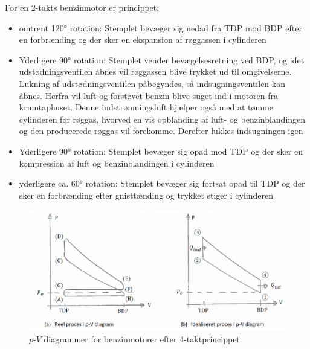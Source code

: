 For en 2-takts benzinmotor er princippet:
\begin{itemize}
  \item omtrent \ang{120} rotation: Stemplet bevæger sig nedad fra TDP mod BDP efter en forbrænding og der sker en ekspansion af røggassen i cylinderen
  \item Yderligere \ang{90} rotation: Stemplet vender bevægelsesretning ved BDP, og idet udstødningsventilen åbnes vil røggassen blive trykket ud til omgivelserne. Lukning af udstødningsventilen påbegyndes, så indsugningsventilen kan åbnes. Herfra vil luft og forstøvet benzin blive suget ind i motoren fra krumtaphuset. Denne indstrømningsluft hjælper også med at tømme cylinderen for røggas, hvorved en vis opblanding af luft- og benzinblandingen og den producerede røggas vil forekomme. Derefter lukkes indsugningen igen
  \item Yderligere \ang{90} rotation: Stemplet bevæger sig opad mod TDP og der sker en kompression af luft og benzinblandingen i cylinderen
  \item yderligere ca. \ang{60} rotation: Stemplet bevæger sig fortsat opad til TDP og der sker en forbrænding efter gnisttænding og trykket stiger i cylinderen
\end{itemize}

\begin{figure} [ht]
  \centering
  \includegraphics[width=0.5\linewidth]{./figures/f10_2.png}
  \caption{$p$-$V$ diagrammer for benzinmotorer efter 4-taktprincippet}
  \label{fig:f10_2}
\end{figure}

